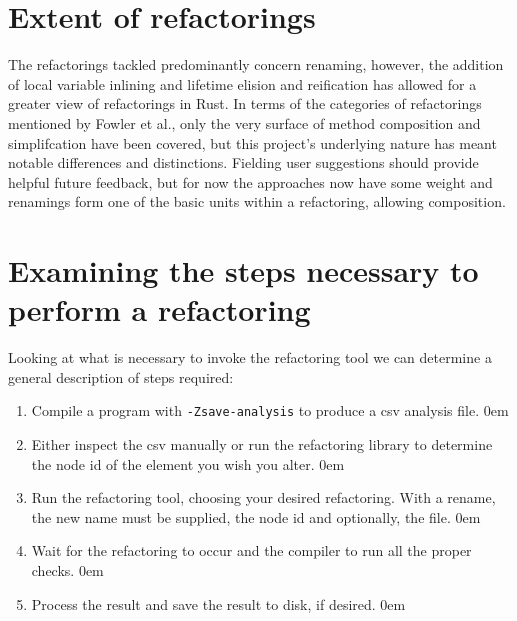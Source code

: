 
\section{Extent of refactorings}\label{S:extentn}

The refactorings tackled predominantly concern renaming, however, the addition of local variable inlining and lifetime elision and reification has allowed for a greater view of refactorings in Rust. In terms of the categories of refactorings mentioned by Fowler et al., only the very surface of method composition and simplifcation have been covered, but this project's underlying nature has meant notable differences and distinctions. Fielding user suggestions should provide helpful future feedback, but for now the approaches now have some weight and renamings form one of the basic units within a refactoring, allowing composition.




\section{Examining the steps necessary to perform a refactoring}\label{S:stepsn}

Looking at what is necessary to invoke the refactoring tool we can determine a general description of steps required:

\begin{enumerate}
\item Compile a program with {\verb|-Zsave-analysis|} to produce a csv analysis file.
\itemsep0em 
\item Either inspect the csv manually or run the refactoring library to determine the node id of the element you wish you alter.
\itemsep0em 
\item Run the refactoring tool, choosing your desired refactoring. With a rename, the new name must be supplied, the node id and optionally, the file.
\itemsep0em 
\item Wait for the refactoring to occur and the compiler to run all the proper checks. 
\itemsep0em 
\item Process the result and save the result to disk, if desired.
\itemsep0em 
\end{enumerate}

